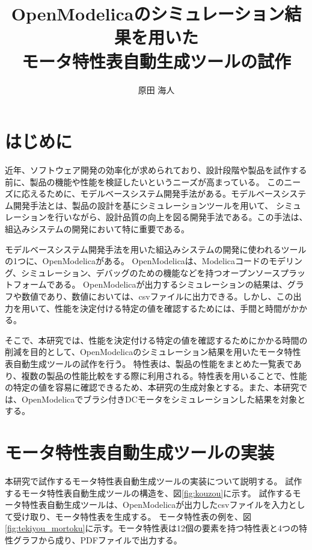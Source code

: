 \documentclass[uplatex, 10pt, a4p]{jsarticle}
\title{OpenModelicaのシミュレーション結果を用いた\\
モータ特性表自動生成ツールの試作}
\author{原田 海人}
\begin{document}
\maketitle


\section{はじめに}
近年、ソフトウェア開発の効率化が求められており、設計段階や製品を試作する前に、製品の機能や性能を検証したいというニーズが高まっている\cite{modelicaモデルベース本}。
このニーズに応えるために、モデルベースシステム開発手法がある\cite{modelicaモデルベース本}。モデルベースシステム開発手法とは、製品の設計を基にシミュレーションツールを用いて、
シミュレーションを行いながら、設計品質の向上を図る開発手法である\cite{ipa_2016}。この手法は、組込みシステムの開発において特に重要である\cite{ipa_useful_modelbase_dev}。

モデルベースシステム開発手法を用いた組込みシステムの開発に使われるツールの1つに、OpenModelica\cite{open_modelica}がある。
OpenModelicaは、Modelica\cite{modelicaモデルベース本}コードのモデリング、シミュレーション、デバッグのための機能などを持つオープンソースプラットフォームである。
OpenModelicaが出力するシミュレーションの結果は、グラフや数値であり、数値においては、csvファイルに出力できる。しかし、この出力を用いて、性能を決定付ける特定の値を確認するためには、手間と時間がかかる。

そこで、本研究では、性能を決定付ける特定の値を確認するためにかかる時間の削減を目的として、OpenModelicaのシミュレーション結果を用いたモータ特性表自動生成ツールの試作を行う。
特性表は、製品の性能をまとめた一覧表であり、複数の製品の性能比較をする際に利用される\cite{特性表1,特性表2,特性表3}。特性表を用いることで、性能の特定の値を容易に確認できるため、本研究の生成対象とする。また、本研究では、OpenModelicaでブラシ付きDCモータ\cite{モータ使う}をシミュレーションした結果を対象とする。


\section{モータ特性表自動生成ツールの実装}\label{cha:OverviewFunction}
本研究で試作するモータ特性表自動生成ツールの実装について説明する。
試作するモータ特性表自動生成ツールの構造を、図\ref{fig:kouzou}に示す。
試作するモータ特性表自動生成ツールは、OpenModelicaが出力したcsvファイルを入力として受け取り、モータ特性表を生成する。
モータ特性表の例を、図\ref{fig:tekiyou_mortoku}に示す。モータ特性表は12個の要素を持つ特性表と4つの特性グラフから成り、PDFファイルで出力する。
\end{document}
